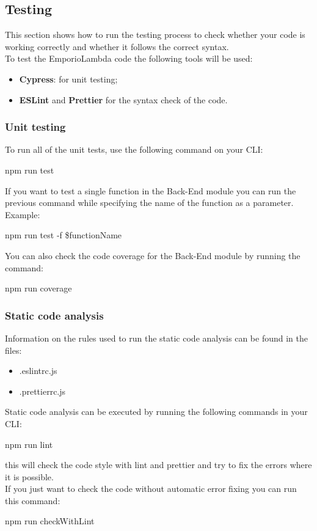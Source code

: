 \subsection{Testing}
This section shows how to run the testing process to check whether your code is working correctly and whether it follows the correct syntax. \\ 
To test the EmporioLambda code the following tools will be used:
\begin{itemize}
\item \textbf{Cypress}: for unit testing;
\item \textbf{ESLint} and \textbf{Prettier} for the syntax check of the code.
\end{itemize}

\subsubsection{Unit testing}
To run all of the unit tests, use the following command on your CLI:
\begin{center}
npm run test
\end{center}
If you want to test a single function in the Back-End module you can run the previous command while specifying the name of the function as a parameter.\\
Example:
\begin{center}
npm run test -f \$functionName
\end{center}
You can also check the code coverage for the Back-End module by running the command:
\begin{center}
npm run coverage
\end{center}

\subsubsection{Static code analysis}
Information on the rules used to run the static code analysis can be found in the files:
\begin{itemize}
\item .eslintrc.js
\item .prettierrc.js
\end{itemize}
Static code analysis can be executed by running the following commands in your CLI:
\begin{center}
npm run lint
\end{center}
this will check the code style with lint and prettier and try to fix the errors where it is possible.\\ 
If you just want to check the code without automatic error fixing you can run this command:
\begin{center}
npm run checkWithLint
\end{center}